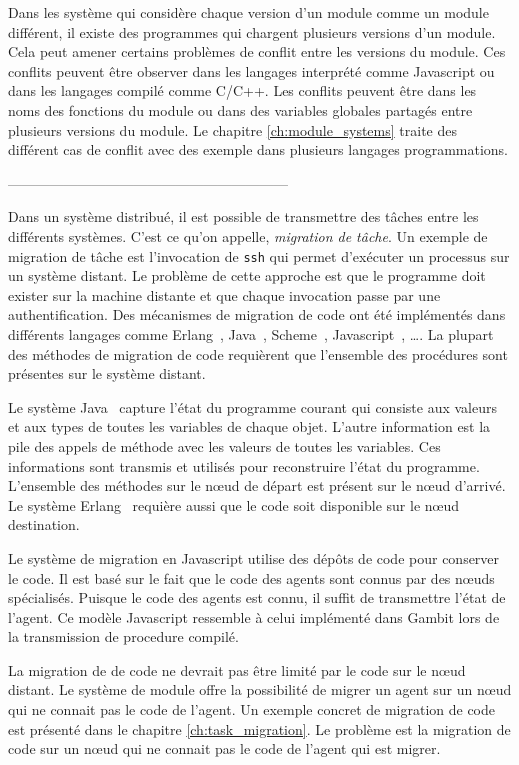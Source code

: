 Dans les système qui considère chaque version d'un module comme un module différent,
il existe des programmes qui chargent plusieurs versions d'un module. Cela peut amener
certains problèmes de conflit entre les versions du module. Ces conflits peuvent être
observer dans les langages interprété comme Javascript ou dans les langages compilé
comme C/C++. Les conflits peuvent être dans les noms des fonctions du module ou
dans des variables globales partagés entre plusieurs versions du module. Le chapitre
\ref{ch:module_systems} traite des différent cas de conflit avec des exemple
dans plusieurs langages programmations.


------------------------------------------------------------

Dans un système
distribué, il est possible de transmettre des tâches entre les différents
systèmes. C'est ce qu'on appelle, \textit{migration de tâche}.  Un exemple de
migration de tâche est l'invocation de \texttt{ssh} qui permet d'exécuter un
processus sur un système distant. Le problème de cette approche est que le
programme doit exister sur la machine distante et que chaque invocation passe
par une authentification. Des mécanismes de migration de code ont été
implémentés dans différents langages comme Erlang~\cite{M_mobileintelligent},
Java~\cite{And98transparentmigration}, Scheme~\cite{Sumii00animplementation},
Javascript~\cite{DEV2017transparentmigration}, \dots.  La plupart des méthodes
de migration de code requièrent que l'ensemble des procédures sont
présentes sur le système distant.

Le système Java~\cite{And98transparentmigration} capture l'état du programme courant
qui consiste aux valeurs et aux types de toutes les variables de chaque objet. L'autre
information est la pile des appels de méthode avec les valeurs de toutes les variables.
Ces informations sont transmis et utilisés pour reconstruire l'état du programme.
L'ensemble des méthodes sur le nœud de départ est présent sur le nœud d'arrivé.
Le système Erlang~\cite{M_mobileintelligent} requière aussi que le code soit disponible
sur le nœud destination.

Le système de migration en Javascript utilise des dépôts de code pour conserver
le code. Il est basé sur le fait que le code des agents sont connus par des
nœuds spécialisés. Puisque le code des agents est connu, il suffit de
transmettre l'état de l'agent. Ce modèle Javascript ressemble à celui
implémenté dans Gambit lors de la transmission de procedure compilé.

La migration de de code ne devrait pas être limité par le code sur le nœud
distant. Le système de module offre la possibilité de migrer un agent sur un
nœud qui ne connait pas le code de l'agent. Un exemple concret de migration
de code est présenté dans le chapitre \ref{ch:task_migration}. Le problème
est la migration de code sur un nœud qui ne connait pas le code de l'agent qui
est migrer.


